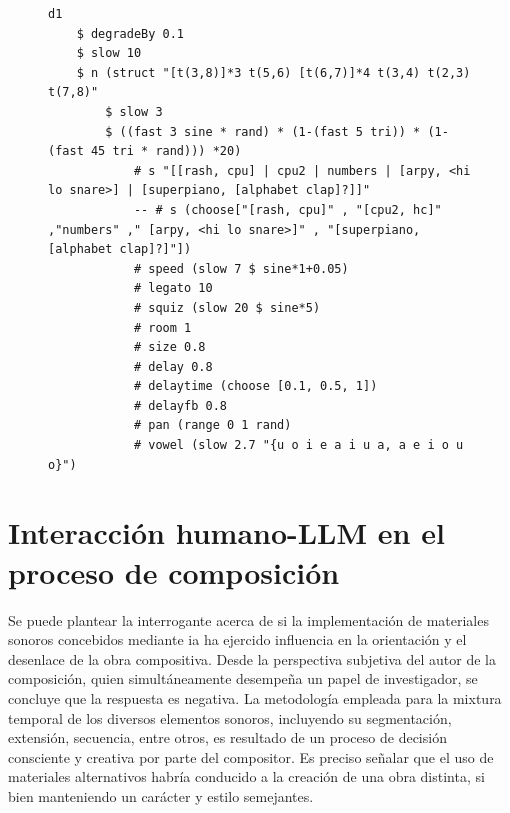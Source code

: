 \begin{figure}[H]
    \centering
    \begin{lstlisting}[style=SuperCollider-IDE, language=ExtendedHaskell, basicstyle=\footnotesize\ttfamily, numbers=none]
d1 
    $ degradeBy 0.1
    $ slow 10 
    $ n (struct "[t(3,8)]*3 t(5,6) [t(6,7)]*4 t(3,4) t(2,3) t(7,8)"
        $ slow 3 
        $ ((fast 3 sine * rand) * (1-(fast 5 tri)) * (1-(fast 45 tri * rand))) *20) 
            # s "[[rash, cpu] | cpu2 | numbers | [arpy, <hi lo snare>] | [superpiano, [alphabet clap]?]]" 
            -- # s (choose["[rash, cpu]" , "[cpu2, hc]" ,"numbers" ," [arpy, <hi lo snare>]" , "[superpiano, [alphabet clap]?]"])
            # speed (slow 7 $ sine*1+0.05) 
            # legato 10
            # squiz (slow 20 $ sine*5)
            # room 1
            # size 0.8
            # delay 0.8
            # delaytime (choose [0.1, 0.5, 1])
            # delayfb 0.8
            # pan (range 0 1 rand)
            # vowel (slow 2.7 "{u o i e a i u a, a e i o u o}")
    \end{lstlisting}
    \source{\propio}
    \label{fig:ejemplo_tidal_irregular}
\end{figure}

\section{Interacción humano-LLM en el proceso de composición}

Se puede plantear la interrogante acerca de si la implementación de materiales sonoros concebidos mediante \gls{ia} ha ejercido influencia en la orientación y el desenlace de la obra compositiva. Desde la perspectiva subjetiva del autor de la composición, quien simultáneamente desempeña un papel de investigador, se concluye que la respuesta es negativa. La metodología empleada para la mixtura temporal de los diversos elementos sonoros, incluyendo su segmentación, extensión, secuencia, entre otros, es resultado de un proceso de decisión consciente y creativa por parte del compositor. Es preciso señalar que el uso de materiales alternativos habría conducido a la creación de una obra distinta, si bien manteniendo un carácter y estilo semejantes.

